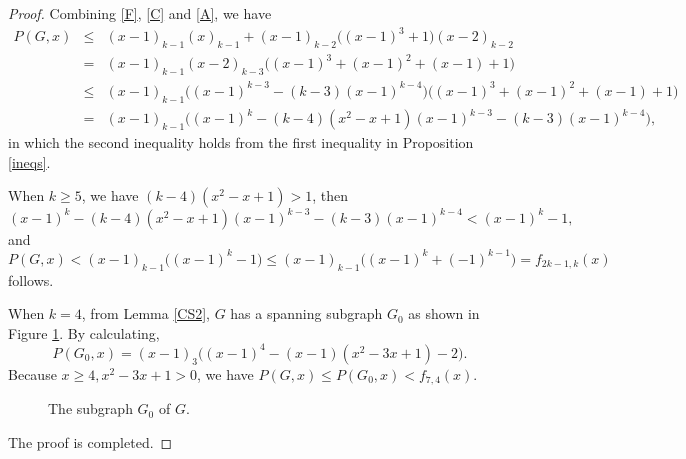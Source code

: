 \documentclass[12pt]{article}
\theoremstyle{definition}
\begin{document}
\begin{proof}
Combining \eqref{F}, \eqref{C} and \eqref{A}, we have
\begin{eqnarray*}P(G,x)%
&\leq& (x-1)_{k-1}(x)_{k-1}+(x-1)_{k-2}\big((x-1)^3+1\big)(x-2)_{k-2}\\
&=&(x-1)_{k-1}(x-2)_{k-3}\big((x-1)^3+(x-1)^2+(x-1)+1\big)\\
&\leq&(x-1)_{k-1}\big((x-1)^{k-3}-(k-3)(x-1)^{k-4}\big)\big((x-1)^3+(x-1)^2+(x-1)+1\big)\\
&=&(x-1)_{k-1}\big((x-1)^k-(k-4)(x^2-x+1)(x-1)^{k-3}-(k-3)(x-1)^{k-4}\big),
\end{eqnarray*}
in which the second inequality holds from the first inequality in Proposition \ref{ineqs}.

When $k\geq 5$, we have $(k-4)(x^2-x+1)> 1$, then
$$(x-1)^k-(k-4)(x^2-x+1)(x-1)^{k-3}-(k-3)(x-1)^{k-4}<(x-1)^k-1,$$
and $$P(G,x)<(x-1)_{k-1}\big((x-1)^k-1\big)\leq (x-1)_{k-1}\big((x-1)^k+(-1)^{k-1}\big)=f_{2k-1,k}(x)$$ follows.

When $k=4$, from Lemma \ref{CS2}, $G$ has a spanning subgraph $G_0$ as shown in Figure \ref{fig4}. By calculating,
$$P(G_0,x)=(x-1)_3\big((x-1)^4-(x-1)(x^2-3x+1)-2\big).$$
Because $x\geq 4, x^2-3x+1>0$, we have $P(G,x)\leq P(G_0,x)< f_{7,4}(x)$.

\begin{figure}[h]
\begin{center}
\caption{The subgraph $G_0$ of $G$.}
\label{fig4}
\end{center}
\end{figure}



The proof is completed.

\end{proof}
\end{document}
